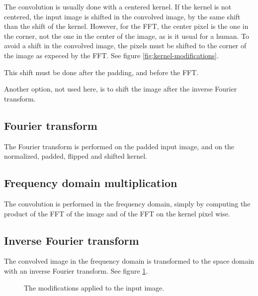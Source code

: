 \documentclass{InsightArticle}
\begin{document}
The convolution is usually done with a centered kernel. If the kernel is not centered, the input image
is shifted in the convolved image, by the same shift than the shift of the kernel. However, for the
FFT, the center pixel is the one in the corner, not the one in the center of the image, as is it 
usual for a human. To avoid a shift in the convolved image, the pixels must be shifted to the corner
of the image as expeced by the FFT. See figure \ref{fig:kernel-modifications}.

This shift must be done after the padding, and before the FFT.

Another option, not used here, is to shift the image after the inverse Fourier transform.

\subsection{Fourier transform}

The Fourier transform is performed on the padded input image, and on the normalized, padded, flipped
and shifted kernel.

\subsection{Frequency domain multiplication}

The convolution is performed in the frequency domain, simply by computing the product of the FFT of
the image and of the FFT on the kernel pixel wise.

\subsection{Inverse Fourier transform}

The convolved image in the frequency domain is transformed to the space domain with an inverse Fourier
transform. See figure \ref{fig:image-modifications}.

\begin{figure}[htbp]
\begin{center}
\caption{The modifications applied to the input image.\label{fig:image-modifications}}
\end{center}
\end{figure}
\end{document}
